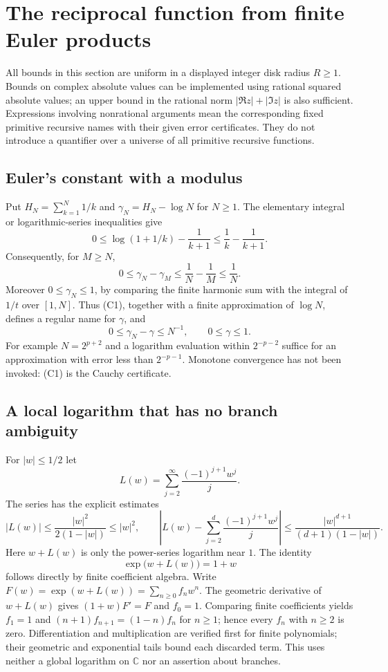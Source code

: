 
\section{The reciprocal function from finite Euler products}
\label{sec:reciprocal-products}

All bounds in this section are uniform in a displayed integer disk radius
$R\geq1$.  Bounds on complex absolute values can be implemented using rational
squared absolute values; an upper bound in the rational norm
$|\Re z|+|\Im z|$ is also sufficient.  Expressions involving nonrational
arguments mean the corresponding fixed primitive recursive names with their
given error certificates.  They do not introduce a quantifier over a universe
of all primitive recursive functions.

\subsection{Euler's constant with a modulus}
Put $H_N=\sum_{k=1}^N1/k$ and $\gamma_N=H_N-\log N$ for $N\geq1$.
The elementary integral or logarithmic-series inequalities give
\[
 0\leq\log(1+1/k)-\frac1{k+1}
 \leq\frac1k-\frac1{k+1}.
\]
Consequently, for $M\geq N$,
\[
 0\leq\gamma_N-\gamma_M\leq\frac1N-\frac1M\leq\frac1N.
 \tag{C1}
\]
Moreover $0\leq\gamma_N\leq1$, by comparing the finite harmonic sum with
the integral of $1/t$ over $[1,N]$.  Thus (C1), together with a finite
approximation of $\log N$, defines a regular name for $\gamma$, and
\[
 0\leq\gamma_N-\gamma\leq N^{-1},\qquad 0\leq\gamma\leq1.
 \tag{C2}
\]
For example $N=2^{p+2}$ and a logarithm evaluation within $2^{-p-2}$
suffice for an approximation with error less than $2^{-p-1}$.
Monotone convergence has not been invoked: (C1) is the Cauchy certificate.

\subsection{A local logarithm that has no branch ambiguity}
For $|w|\leq1/2$ let
\[
 L(w)=\sum_{j=2}^{\infty}\frac{(-1)^{j+1}w^j}{j}.
\]
The series has the explicit estimates
\[
 |L(w)|\leq\frac{|w|^2}{2(1-|w|)}\leq|w|^2,
 \qquad
 \left|L(w)-\sum_{j=2}^{d}\frac{(-1)^{j+1}w^j}{j}\right|
 \leq\frac{|w|^{d+1}}{(d+1)(1-|w|)}.
 \tag{C3}
\]
Here $w+L(w)$ is only the power-series logarithm near $1$.
The identity
\[
 \exp\bigl(w+L(w)\bigr)=1+w
 \tag{C4}
\]
follows directly by finite coefficient algebra.  Write
$F(w)=\exp(w+L(w))=\sum_{n\geq0}f_nw^n$.
The geometric derivative of $w+L(w)$ gives $(1+w)F'=F$ and $f_0=1$.
Comparing finite coefficients yields $f_1=1$ and
$(n+1)f_{n+1}=(1-n)f_n$ for $n\geq1$; hence every $f_n$ with
$n\geq2$ is zero.  Differentiation and multiplication are verified first
for finite polynomials; their geometric and exponential tails bound each
discarded term.  This uses neither a global logarithm on $\mathbb C$
nor an assertion about branches.


